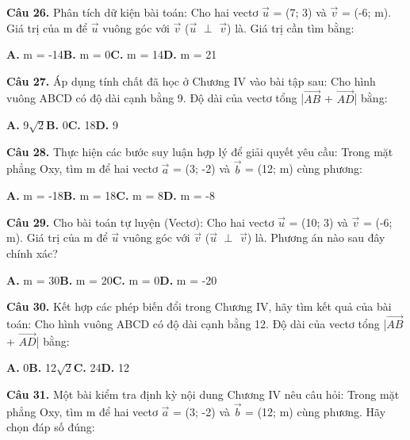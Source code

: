 \documentclass[11pt,a4paper]{article}
\begin{document}
\textbf{\color{primary} Câu 26.} Phân tích dữ kiện bài toán: Cho hai vectơ $\vec{u}$ = (7; 3) và $\vec{v}$ = (-6; m). Giá trị của m để $\vec{u}$ vuông góc với $\vec{v}$ ($\vec{u}$ $\perp$ $\vec{v}$) là. Giá trị cần tìm bằng:\par
\hspace*{1.5em}\textbf{A.} m = -14\quad\quad \textbf{B.} m = 0\quad\quad \textbf{C.} m = 14\quad\quad \textbf{D.} m = 21\par\vspace{2pt}
\textbf{\color{primary} Câu 27.} Áp dụng tính chất đã học ở Chương IV vào bài tập sau: Cho hình vuông ABCD có độ dài cạnh bằng 9. Độ dài của vectơ tổng |$\overrightarrow{AB}$ + $\overrightarrow{AD}$| bằng:\par
\hspace*{1.5em}\textbf{A.} 9$\sqrt{2}$\quad\quad \textbf{B.} 0\quad\quad \textbf{C.} 18\quad\quad \textbf{D.} 9\par\vspace{2pt}
\textbf{\color{primary} Câu 28.} Thực hiện các bước suy luận hợp lý để giải quyết yêu cầu: Trong mặt phẳng Oxy, tìm m để hai vectơ $\vec{a}$ = (3; -2) và $\vec{b}$ = (12; m) cùng phương:\par
\hspace*{1.5em}\textbf{A.} m = -18\quad\quad \textbf{B.} m = 18\quad\quad \textbf{C.} m = 8\quad\quad \textbf{D.} m = -8\par\vspace{2pt}
\textbf{\color{primary} Câu 29.} Cho bài toán tự luyện (Vectơ): Cho hai vectơ $\vec{u}$ = (10; 3) và $\vec{v}$ = (-6; m). Giá trị của m để $\vec{u}$ vuông góc với $\vec{v}$ ($\vec{u}$ $\perp$ $\vec{v}$) là. Phương án nào sau đây chính xác?\par
\hspace*{1.5em}\textbf{A.} m = 30\quad\quad \textbf{B.} m = 20\quad\quad \textbf{C.} m = 0\quad\quad \textbf{D.} m = -20\par\vspace{2pt}
\textbf{\color{primary} Câu 30.} Kết hợp các phép biến đổi trong Chương IV, hãy tìm kết quả của bài toán: Cho hình vuông ABCD có độ dài cạnh bằng 12. Độ dài của vectơ tổng |$\overrightarrow{AB}$ + $\overrightarrow{AD}$| bằng:\par
\hspace*{1.5em}\textbf{A.} 0\quad\quad \textbf{B.} 12$\sqrt{2}$\quad\quad \textbf{C.} 24\quad\quad \textbf{D.} 12\par\vspace{2pt}
\textbf{\color{primary} Câu 31.} Một bài kiểm tra định kỳ nội dung Chương IV nêu câu hỏi: Trong mặt phẳng Oxy, tìm m để hai vectơ $\vec{a}$ = (3; -2) và $\vec{b}$ = (12; m) cùng phương. Hãy chọn đáp số đúng:\par
\end{document}
